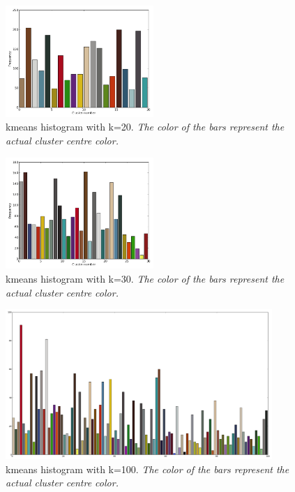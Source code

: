 \documentclass[10pt,twocolumn,letterpaper]{article}
\begin{document}
\begin{figure}[p]
  \centering
  \includegraphics[width=0.50\textwidth]{../results/20_histogram.png}
  \caption{kmeans histogram with k=20. \emph{The color of the bars
represent the actual cluster centre color.}}
  \label{k-20}
\end{figure}

\begin{figure}[p]
  \centering
  \includegraphics[width=0.50\textwidth]{../results/30_histogram.png}
  \caption{kmeans histogram with k=30. \emph{The color of the bars
represent the actual cluster centre color.}}
  \label{k-30}
\end{figure}

\begin{figure}[p]
  \centering
  \includegraphics[width=0.90\textwidth]{../results/100_histogram.png}
  \caption{kmeans histogram with k=100. \emph{The color of the bars
represent the actual cluster centre color.}}
  \label{k-100}
\end{figure}
\end{document}
